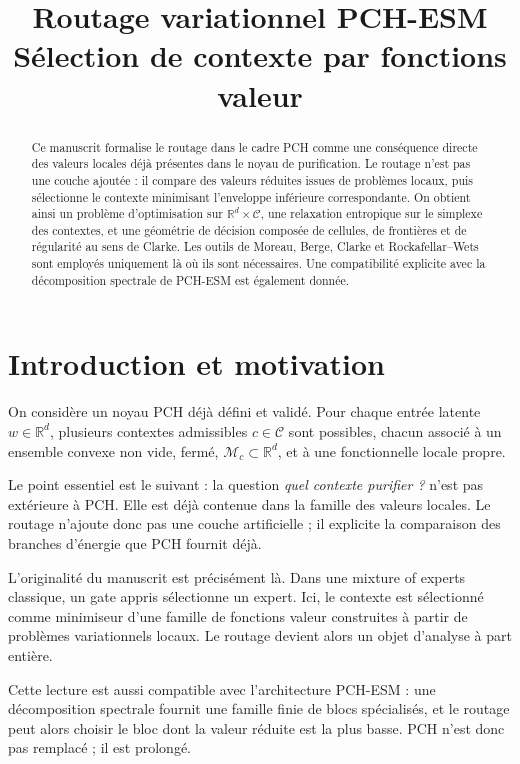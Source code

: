 \documentclass[11pt,a4paper]{article}
\title{Routage variationnel PCH-ESM\\
\large Sélection de contexte par fonctions valeur}
\author{}
\date{}
\newcommand{\R}{\mathbb R}
\newcommand{\Mcal}{\mathcal M}
\newcommand{\Ccal}{\mathcal C}
\begin{document}
\maketitle

\begin{abstract}
Ce manuscrit formalise le routage dans le cadre PCH comme une conséquence directe des valeurs locales déjà présentes dans le noyau de purification. Le routage n'est pas une couche ajoutée : il compare des valeurs réduites issues de problèmes locaux, puis sélectionne le contexte minimisant l'enveloppe inférieure correspondante. On obtient ainsi un problème d'optimisation sur \(\R^d\times\Ccal\), une relaxation entropique sur le simplexe des contextes, et une géométrie de décision composée de cellules, de frontières et de régularité au sens de Clarke. Les outils de Moreau, Berge, Clarke et Rockafellar--Wets sont employés uniquement là où ils sont nécessaires. Une compatibilité explicite avec la décomposition spectrale de PCH-ESM est également donnée.
\end{abstract}

\tableofcontents

\section{Introduction et motivation}

On considère un noyau PCH déjà défini et validé. Pour chaque entrée latente \(w\in\R^d\), plusieurs contextes admissibles \(c\in\Ccal\) sont possibles, chacun associé à un ensemble convexe non vide, fermé, \(\Mcal_c\subset\R^d\), et à une fonctionnelle locale propre.

Le point essentiel est le suivant : la question \emph{quel contexte purifier ?} n'est pas extérieure à PCH. Elle est déjà contenue dans la famille des valeurs locales. Le routage n'ajoute donc pas une couche artificielle ; il explicite la comparaison des branches d'énergie que PCH fournit déjà.

L'originalité du manuscrit est précisément là. Dans une mixture of experts classique, un gate appris sélectionne un expert. Ici, le contexte est sélectionné comme minimiseur d'une famille de fonctions valeur construites à partir de problèmes variationnels locaux. Le routage devient alors un objet d'analyse à part entière.

Cette lecture est aussi compatible avec l'architecture PCH-ESM : une décomposition spectrale fournit une famille finie de blocs spécialisés, et le routage peut alors choisir le bloc dont la valeur réduite est la plus basse. PCH n'est donc pas remplacé ; il est prolongé.
\end{document}
